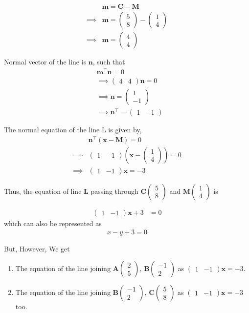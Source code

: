 \documentclass[journal,12pt,twocolumn]{IEEEtran}
\let\vec\mathbf
\newcommand{\myvec}[1]{\ensuremath{\begin{pmatrix}#1\end{pmatrix}}}
\providecommand{\brak}[1]{\ensuremath{\left(#1\right)}}
\begin{document}
    \begin{align}
        &\vec{m} = \vec{C} - \vec{M}\\
	    \implies &\vec{m} = \myvec{5 \\ 8} - \myvec{1 \\ 4}\\
	    \implies &\vec{m} = \myvec{4 \\ 4}
    \end{align}
    
    Normal vector of the line is $\vec{n}$, such that
    \begin{align}
	    &\vec{m}^{\top}\vec{n} = 0\\
	    &\implies \myvec{4 & 4}\vec{n} = 0\\
	    &\implies \vec{n} = \myvec{1 \\ -1}\\
	    &\implies \vec{n}^{\top} = \myvec{1 & -1}
    \end{align}
    
    The normal equation of the line L is given by, 
    \begin{align}
	    &\vec{n}^{\top}\brak{\vec{x} - \vec{M}} = 0\\
	    \implies &\myvec{1 & -1}\brak{\vec{x} - \myvec{1 \\ 4}}= 0\\
	    \implies &\myvec{1 & -1}\vec{x} = -3
    \end{align}
    
    Thus, the equation of line $\vec{L}$ passing through  $\vec{C}\myvec{5\\8}$ and $\vec{M}\myvec{1\\4}$ is 
        
    \begin{align}
          \myvec{1 & - 1}\vec{x} + 3 &= 0
    \end{align}
        which can also be represented as 
    \begin{align}
         x-y+3=0
    \end{align}
      
    {\large But, However,} We get
    \begin{enumerate}
        \item The equation of the line joining $\vec{A}\myvec{2\\5}$, $\vec{B}\myvec{-1\\2}$ as $\myvec{1 & - 1}\vec{x} = -3$.
           
        \item The equation of the line joining $\vec{B}\myvec{-1\\2}$, $\vec{C}\myvec{5\\8}$ as $\myvec{1 & - 1}\vec{x}=-3$ too.
    \end{enumerate}
   
\end{document}
